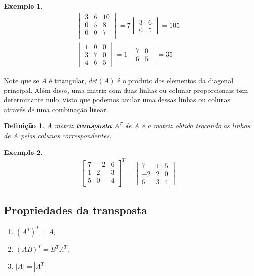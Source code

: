 \documentclass{article}
\newtheorem*{definition}{Definição}
\newtheorem*{example}{Exemplo}
\begin{document}
\begin{example}
	\begin{align*}
	\begin{vmatrix}
	3 & 6 & 10 \\
	0 & 5 & 8 \\
	0 & 0 & 7 \\
	\end{vmatrix} = 7\begin{vmatrix}
	3 & 6 \\
	0 & 5 
	\end{vmatrix} = 105 \\
	\begin{vmatrix}
	1 & 0 & 0 \\
	3 & 7 & 0 \\
	4 & 6 & 5
	\end{vmatrix} = 1\begin{vmatrix}
	7 & 0 \\
	6 & 5
	\end{vmatrix} = 35
	\end{align*}
\end{example}
\par\vspace{0.3cm} Note que se $A$ é triangular, $det(A)$ é o produto dos elementos da diagonal principal. Além disso, uma matriz com duas linhas ou colunar proporcionais tem determinante nulo, visto que podemos anular uma dessas linhas ou colunas através de uma combinação linear.

\begin{definition}
	A matriz \textbf{transposta} $A^T$ de $A$ é a matriz obtida trocando as linhas de $A$ pelas colunas correspondentes.
\end{definition}

\begin{example}
	\begin{align*}
	\begin{bmatrix}
	7 & -2 & 6 \\
	1 & 2 & 3 \\
	5 & 0 & 4 \\
	\end{bmatrix}^T = \begin{bmatrix}
	7 & 1 & 5 \\
	-2 & 2 & 0 \\
	6 & 3 & 4 
	\end{bmatrix}
	\end{align*}
\end{example}

\subsection{Propriedades da transposta}
\begin{enumerate}
	\item $(A^T)^T = A$;
	\item $(AB)^T = B^TA^T$;
	\item $|A| = |A^T|$
\end{enumerate}
\end{document}
